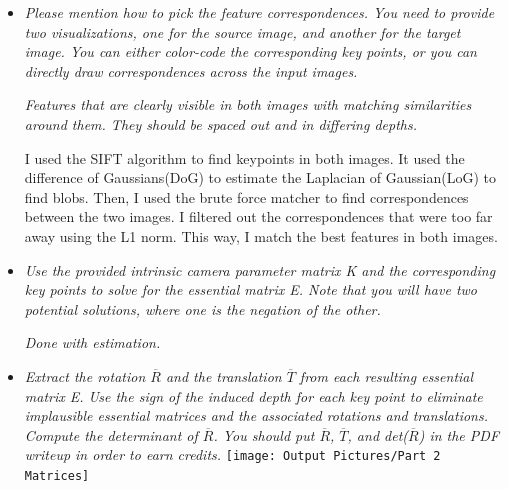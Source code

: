 \documentclass[11pt]{article}
\begin{document}
    \begin{itemize}
        \item \textit{Please mention how to pick the feature correspondences. You need to provide two visualizations,
            one for the source image, and another for the target image. You can either color-code the corresponding
            key points, or you can directly draw correspondences across the input images.}
        \par
        \textit{\textemdash Features that are clearly visible in both images with matching similarities around them.
        They should be spaced out and in differing depths.}
        \par
        I used the SIFT algorithm to find keypoints in both images. It used the difference of Gaussians(DoG) to estimate
        the Laplacian of Gaussian(LoG) to find blobs. Then, I used the brute force matcher to find
        correspondences between the two images. I filtered out the correspondences that were too far away using
        the L1 norm. This way, I match the best features in both images.\newline

        \item \textit{Use the provided intrinsic camera parameter matrix K and the corresponding key points to solve
        for the essential matrix E. Note that you will have two potential solutions, where one is the negation of the
        other.}
        \par
        \textit{\textemdash Done with estimation.}
        \par

        \item \textit{Extract the rotation $\overline{R}$ and the translation $\overline{T}$ from each resulting
        essential matrix E. Use the sign of the induced depth for each key point to eliminate implausible essential
        matrices and the associated rotations and translations. Compute the determinant of $\overline{R}$. You should
        put $\overline{R}$, $\overline{T}$, and det($\overline{R}$) in
        the PDF writeup in order to earn credits.}\newline
        \texttt{[image: Output Pictures/Part 2 Matrices]}\newline


\end{itemize}
\end{document}
